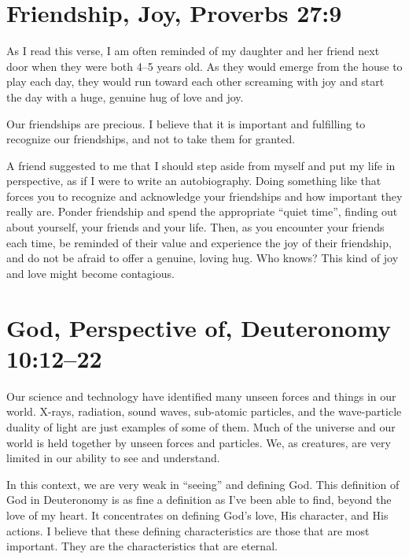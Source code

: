 \documentclass[12pt]{memoir}
\begin{document}
\section[Friendship, Joy]{Friendship, Joy, Proverbs 27:9}

As I read this verse, I am often reminded of my daughter and her friend
next door when they were both 4--5 years old. As they would emerge
from the house to play each day, they would run toward each other
screaming with joy and start the day with a huge, genuine hug of
love and joy.

Our friendships are precious. I believe that it is important and fulfilling to recognize our friendships, and not to take them for granted.

A friend suggested to me that I should step aside from myself and put my life in perspective, as if I were to write an autobiography.
Doing something like that forces you to recognize and acknowledge your friendships and how important they really are.
Ponder friendship and spend the appropriate
``quiet time'', finding out about yourself, your friends and your life. Then, as you encounter your friends each time, be reminded of
their value and experience the joy of their friendship, and do not
be afraid to offer a genuine, loving hug. Who knows? This kind of
joy and love might become contagious.


\section[God, Perspective of]{God, Perspective of, Deuteronomy 10:12--22}

Our science and technology have identified many unseen forces and
things in our world. X-rays, radiation, sound waves, sub-atomic particles,
and the wave-particle duality of light are just examples of some of
them. Much of the universe and our world is held together by unseen
forces and particles. We, as creatures, are very limited in our ability
to see and understand.

In this context, we are very weak in ``seeing''
and defining God. 
This definition of God in Deuteronomy is as fine a definition as I've
been able to find, beyond the love of my heart. It concentrates on
defining God's love, His character, and His actions. I believe that
these defining characteristics are those that are most important.
They are the characteristics that are eternal.
\end{document}
